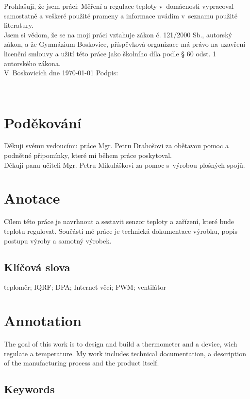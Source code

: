 \documentclass[12pt,a4paper]{article}
\begin{document}
Prohlašuji, že jsem práci: Měření a regulace teploty v~domácnosti vypracoval samostatně a veškeré použité prameny a informace uvádím v~seznamu použité literatury. \\[4mm]
Jsem si vědom, že se na moji práci vztahuje zákon č. 121/2000 Sb., autorský zákon, a že Gymnázium Boskovice, příspěvková organizace má právo na uzavření licenční smlouvy a užití této práce jako školního díla podle § 60 odst. 1 autorského zákona. \\[8mm]
V~Boskovicích dne \today \hspace{24mm} Podpis:

\newpage

~ \vspace{160mm}

\section*{Poděkování}

Děkuji svému vedoucímu práce Mgr. Petru Drahošovi za obětavou pomoc a podnětné připomínky, které mi během práce poskytoval. \\
Děkuji panu učiteli Mgr. Petru Mikuláškovi za pomoc s~výrobou plošných spojů.

\newpage

\section*{Anotace}

Cílem této práce je navrhnout a sestavit senzor teploty a zařízení, které bude teplotu regulovat. Součástí mé práce je technická dokumentace výrobku, popis postupu výroby a samotný výrobek.

\subsection*{Klíčová slova}

teploměr; IQRF; DPA; Internet věcí; PWM; ventilátor


\section*{Annotation}

The goal of this work is to design and build a thermometer and a device, wich regulate a temperature. My work includes technical documentation, a description of the manufacturing process and the product itself.

\subsection*{Keywords}
\end{document}
